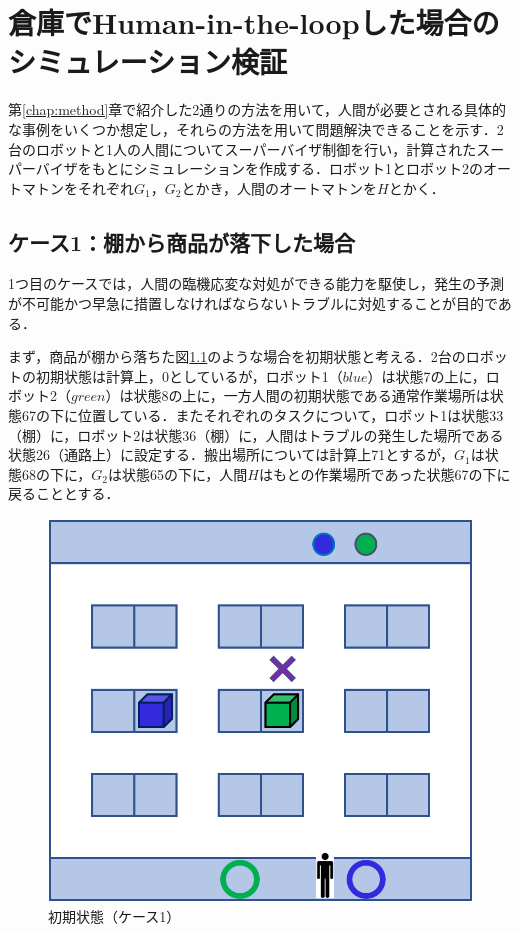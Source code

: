 \chapter{倉庫でHuman-in-the-loopした場合のシミュレーション検証}

第\ref{chap:method}章で紹介した2通りの方法を用いて，人間が必要とされる具体的な事例をいくつか想定し，それらの方法を用いて問題解決できることを示す．2台のロボットと1人の人間についてスーパーバイザ制御を行い，計算されたスーパーバイザをもとにシミュレーションを作成する．ロボット1とロボット2のオートマトンをそれぞれ$G_1，G_2$とかき，人間のオートマトンを$H$とかく．

\section{ケース1：棚から商品が落下した場合} \label{sect:case1}
%

1つ目のケースでは，人間の臨機応変な対処ができる能力を駆使し，発生の予測が不可能かつ早急に措置しなければならないトラブルに対処することが目的である．

まず，商品が棚から落ちた図\ref{fig:HITL1_case1}のような場合を初期状態と考える．2台のロボットの初期状態は計算上，0としているが，ロボット1（$blue$）は状態7の上に，ロボット2（$green$）は状態8の上に，一方人間の初期状態である通常作業場所は状態67の下に位置している．またそれぞれのタスクについて，ロボット1は状態33（棚）に，ロボット2は状態36（棚）に，人間はトラブルの発生した場所である状態26（通路上）に設定する．搬出場所については計算上71とするが，$G_1$は状態68の下に，$G_2$は状態65の下に，人間$H$はもとの作業場所であった状態67の下に戻ることとする．

\begin{figure}[t]
    \centering
    \includegraphics[scale=0.25]{figures/HITL1_case1.png}
    \caption{初期状態（ケース1）}
    \label{fig:HITL1_case1}
\end{figure}


